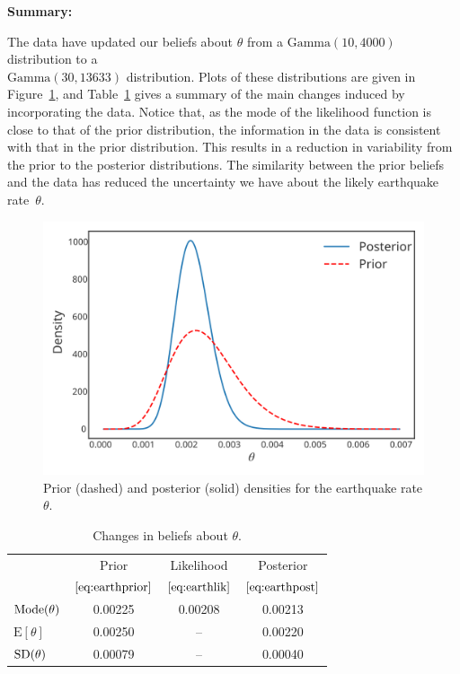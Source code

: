 {{    
}


\textbf{Summary:}

The data have updated our beliefs about $\theta$ from a
$\text{Gamma}(10,4000)$ distribution to a \\ $\text{Gamma}(30,13633)$ distribution. Plots of
these distributions are given in Figure~\ref{fig:earthpost}, and Table~\ref{tab:earthsum} gives a summary of the main changes induced by incorporating the data. Notice that, as the mode of the likelihood function is close to that of the prior distribution, the information in the data is consistent with that in the prior distribution. This results in a reduction in variability from the prior to the posterior distributions. The similarity between the prior beliefs and the data has reduced the uncertainty we have about the likely earthquake rate~$\theta$.

\begin{figure}[ht]

\includegraphics{images/priorposterior3.svg}
\caption{Prior (dashed) and posterior (solid) densities for the earthquake rate $\theta$.} 
\label{fig:earthpost}

\end{figure}

\begin{table}[ht]

\begin{tabular}{|l|c|c|c|}
\cline{2-4}
\multicolumn{1}{c|}{~}& Prior & Likelihood & Posterior \\
\multicolumn{1}{c|}{~}& $\eqref{eq:earthprior}$ & $\eqref{eq:earthlik}$ 
& $\eqref{eq:earthpost}$ \\
\hline
$\textnormal{Mode}(\theta)$ & 0.00225 & 0.00208 & 0.00213 \\
$\text{E}[\theta]$ & 0.00250 & -- & 0.00220 \\
$\textnormal{SD}(\theta)$ & 0.00079 & -- & 0.00040 \\
\hline
\end{tabular}
\caption{Changes in beliefs about $\theta$.}
\label{tab:earthsum}

\end{table}}

